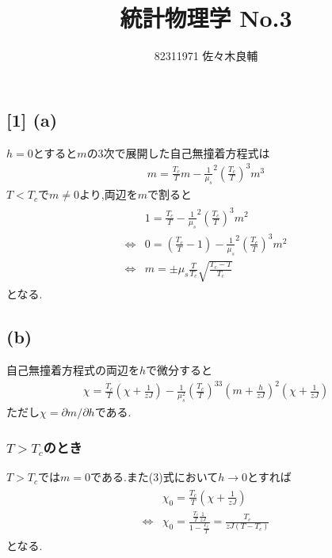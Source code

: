 \documentclass[uplatex,a4j,11pt,dvipdfmx]{jsarticle}
\begin{document}
\title{統計物理学 No.3}
\author{82311971 佐々木良輔}
\date{}
\maketitle
\subsection*{[1] (a)}
$h=0$とすると$m$の3次で展開した自己無撞着方程式は
\begin{align}
    m=\frac{T_c}{T}m-\frac{1}{\mu_s}^2\left(\frac{T_c}{T}\right)^3m^3
\end{align}
$T<T_c$で$m\neq0$より,両辺を$m$で割ると
\begin{align}
  \begin{array}{cc}
    &1=\frac{T_c}{T}-\frac{1}{\mu_s}^2\left(\frac{T_c}{T}\right)^3m^2\\
    \iff&0=\left(\frac{T_c}{T}-1\right)-\frac{1}{\mu_s}^2\left(\frac{T_c}{T}\right)^3m^2\\
    \iff&m=\pm\mu_s\frac{T}{T_c}\sqrt{\frac{T_c-T}{T_c}}
  \end{array}
\end{align}
となる.
\subsection*{(b)}
自己無撞着方程式の両辺を$h$で微分すると
\begin{align}
  \chi=\frac{T_c}{T}\left(\chi+\frac{1}{zJ}\right)-\frac{1}{\mu_s^2}\left(\frac{T_c}{T}\right)^33\left(m+\frac{h}{zJ}\right)^2\left(\chi+\frac{1}{zJ}\right)
\end{align}
ただし$\chi=\partial m/\partial h$である.
\subsubsection*{$T>T_c$のとき}
$T>T_c$では$m=0$である.また(3)式において$h\rightarrow0$とすれば
\begin{align}
  \begin{array}{cc}
    &\chi_0=\frac{T_c}{T}\left(\chi+\frac{1}{zJ}\right)\\
    \iff&\chi_0=\frac{\frac{T_c}{T}\frac{1}{zJ}}{1-\frac{T_c}{T}}=\frac{T_c}{zJ(T-T_c)}
  \end{array}
\end{align}
となる.
\end{document}

